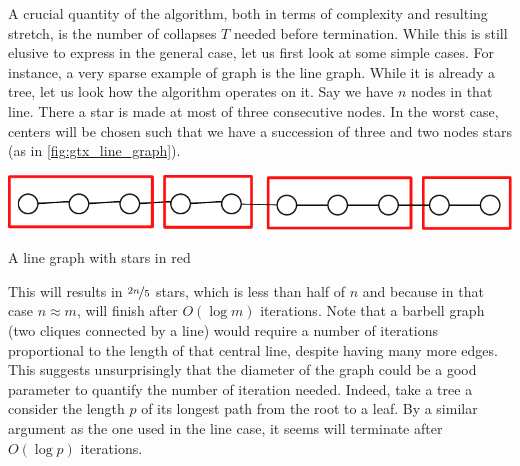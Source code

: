 A crucial quantity of the \gtx{} algorithm, both in terms of complexity and resulting stretch, is
the number of collapses $T$ needed before termination. While this is still elusive to express in the
general case, let us first look at some simple cases. For instance, a very sparse example of graph
is the line graph. While it is already a tree, let us look how the \gtx{} algorithm operates on it.
Say we have $n$ nodes in that line. There a star is made at most of three consecutive nodes. In the
worst case, centers will be chosen such that we have a succession of three and two nodes stars (as
in \autoref{fig:gtx_line_graph}).%
\begin{marginfigure}
  \centering
  \includegraphics[width=0.9\linewidth]{assets/tmp-code/line_graph.pdf}
  \caption{A line graph with stars in red}
  \label{fig:gtx_line_graph}
\end{marginfigure}
This will results in $\nicefrac{2n}{5}$ stars, which is less than half of $n$ and because in that
case $n\approx m$, \gtx{} will finish after $O(\log m)$ iterations. Note that a barbell graph (two
cliques connected by a line) would require a number of iterations proportional to the length of that
central line, despite having many more edges. This suggests unsurprisingly that the diameter of the graph
could be a good parameter to quantify the number of iteration needed. Indeed, take a tree a consider
the length $p$ of its longest path from the root to a leaf. By a similar argument as the one used in
the line case, it seems \gtx{} will terminate after $O(\log p)$ iterations.
